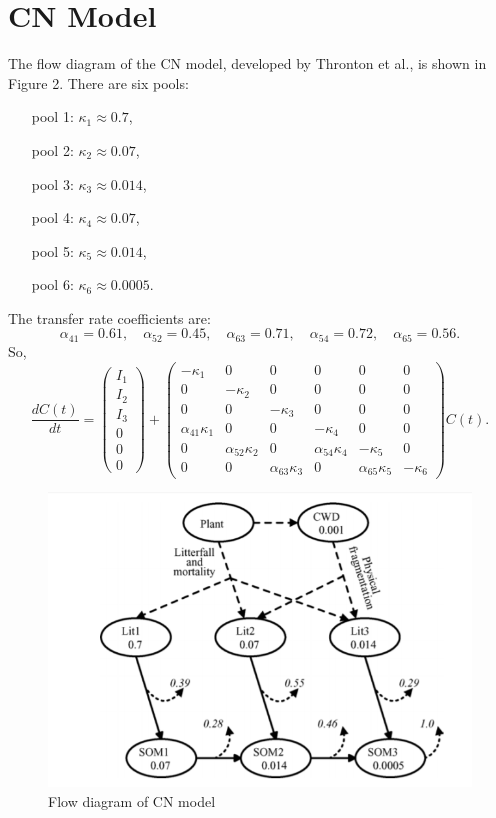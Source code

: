 \documentclass[10pt,a4paper]{article}
\begin{document}
\section*{CN Model}
The flow diagram of the CN model, developed by Thronton et al., is shown in Figure 2. There are six pools:
\begin{itemize}
\item[pool 1:]   $\kappa_1 \approx 0.7$,
\item[pool 2:]  $\kappa_2 \approx 0.07$,
\item[pool 3:]   $\kappa_3 \approx 0.014$,
\item[pool 4:]  $\kappa_4 \approx 0.07$,
\item[pool 5:]   $\kappa_5 \approx 0.014$,
\item[pool 6:]   $\kappa_6 \approx 0.0005$.
\end{itemize}
The transfer rate coefficients are:
\begin{equation*}
\alpha_{41}  = 0.61, \quad \alpha_{52}  = 0.45, \quad \alpha_{63}  = 0.71, \quad \alpha_{54} = 0.72, \quad \alpha_{65} = 0.56.
\end{equation*}
So,
\begin{equation*}
\frac{dC(t)}{dt} = \left( {\begin{array}{c}
    I_1 \\ I_2 \\ I_3   \\ 0 \\ 0  \\ 0 \end{array} } \right) + 
   \left( {\begin{array}{cccccc}
   -\kappa_1 & 0 & 0 & 0 & 0 & 0\\       
   0 & -\kappa_2 & 0 & 0 & 0 & 0\\ 
   0 & 0 & -\kappa_3 & 0 & 0 & 0 \\
   \alpha_{41}\kappa_1 & 0 & 0 & -\kappa_4 & 0 & 0 \\
   0 &  \alpha_{52}\kappa_2 & 0 & \alpha_{54}\kappa_4 & -\kappa_5 & 0 \\
   0 & 0 & \alpha_{63}\kappa_3 & 0 & \alpha_{65}\kappa_5 & -\kappa_6    
   \end{array} } \right) C(t).
\end{equation*}
\begin{figure}[!h]
\centering
\includegraphics[scale=0.9]{cn}
\caption{Flow diagram of CN model}
\end{figure}
\end{document}
